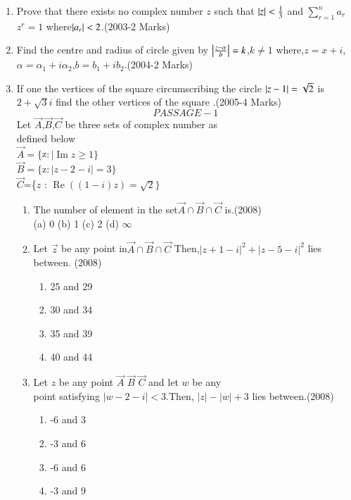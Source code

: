 \documentclass[journal]{IEEEtran}
\begin{document}
\begin{enumerate}[start=7]
\item Prove that there exists no complex number $z$ such that $\left\vert z\right\vert<\frac{1}{3}$ and $\sum_{r=1}^{n}$$a_r$$z^{r}=1$ where$\left\vert a_r\right\vert<2$.\hfill (2003-2 Marks)\\
\item Find the centre and radius  of circle given by $\left\vert\frac{z-\alpha} b\right\vert=k$,$k\not=1$ where,$z=x+i$,$\alpha=\alpha_1+i\alpha_2$,$b=b_{1}+ib_{2}$.\hfill(2004-2 Marks)\\ 
\item If one the vertices of the square circumscribing the circle $\left\vert z-1\right\vert=\sqrt{2}$ is $2+\sqrt{3}i$ find the other vertices of the square .\hfill (2005-4 Marks) \\
$$PASSAGE-1$$
Let $\vec{A}$,$\vec{B}$,$\vec{C}$ be three sets of complex number as\\ defined below\\$\vec{A} = \{ $z$ :\mid \operatorname{Im}z\geq1\}$\\$\vec{B}=\{$z$:|z-2-i|=3\}$\\$\vec{C}$=\{$z$ : $\operatorname{Re} \left((1-i)z\right) = \sqrt{2} \}$\\
\begin{enumerate}     
\item The number of element in the set$\vec{A} \cap\vec{B} \cap\vec{C} $ is.\hfill (2008)\\
   (a) 0 \hfill
   (b) 1 \hfill
   (c) 2 \hfill
   (d) $\infty$\\
\item Let $\vec{z}$ be any point in$ \vec{A}\cap\vec{B}\cap\vec{C} $ Then,$|z+1-i|^2+|z-5-i|^2$ lies between. \hfill  (2008) 
\begin{multicols}{2}
    \begin{enumerate}
        \item 25 and 29
        \item 30 and 34
        \item 35 and 39
        \item 40 and 44
    \end{enumerate}
\end{multicols}
\item  Let $z$ be any point $\vec{A}$ $\vec{B}$ $\vec{C}$ and let $w$ be any\\point satisfying $|w-2-i|<3$.Then, $|z|-|w|+3$ lies between.\hfill (2008) 
 \begin{multicols}{2}
  \begin{enumerate}
    \item -6 and 3
    \item -3 and 6 
    \item -6 and 6
    \item -3 and 9
  \end{enumerate}
 \end{multicols}
\end{enumerate}
\end{enumerate}
\end{document}
